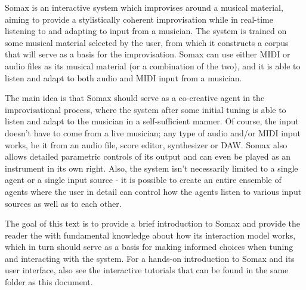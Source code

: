 Somax is an interactive system which improvises around a musical material, aiming to provide a stylistically coherent improvisation while in real-time listening to and adapting to input from a musician. The system is trained on some musical material selected by the user, from which it constructs a corpus that will serve as a basis for the improvisation. Somax can use either MIDI or audio files as its musical material (or a combination of the two), and it is able to listen and adapt to both audio and MIDI input from a musician. 

The main idea is that Somax should serve as a co-creative agent in the improvisational process, where the system after some initial tuning is able to listen and adapt to the musician in a self-sufficient manner. Of course, the input doesn't have to come from a live musician; any type of audio and/or MIDI input works, be it from an audio file, score editor, synthesizer or DAW. Somax also allows detailed parametric controls of its output and can even be played as an instrument in its own right. Also, the system isn't necessarily limited to a single agent or a single input source - it is possible to create an entire ensemble of agents where the user in detail can control how the agents listen to various input sources as well as to each other.

The goal of this text is to provide a brief introduction to Somax and provide the reader the with fundamental knowledge about how its interaction model works, which in turn should serve as a basis for making informed choices when tuning and interacting with the system. For a hands-on introduction to Somax and its user interface, also see the interactive tutorials that can be found in the same folder as this document.